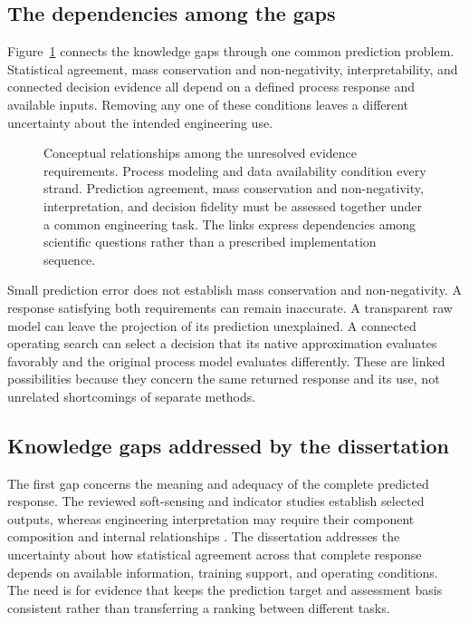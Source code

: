 \subsection{The dependencies among the gaps}

Figure~\ref{fig:rrl_intersecting_gaps} connects the knowledge gaps through one common prediction problem. Statistical agreement, mass conservation and non-negativity, interpretability, and connected decision evidence all depend on a defined process response and available inputs. Removing any one of these conditions leaves a different uncertainty about the intended engineering use.

\begin{figure}[htbp]
\centering
\begingroup\linespread{1}\selectfont

\endgroup
\caption{Conceptual relationships among the unresolved evidence requirements. Process modeling and data availability condition every strand. Prediction agreement, mass conservation and non-negativity, interpretation, and decision fidelity must be assessed together under a common engineering task. The links express dependencies among scientific questions rather than a prescribed implementation sequence.}
\label{fig:rrl_intersecting_gaps}
\end{figure}

Small prediction error does not establish mass conservation and non-negativity. A response satisfying both requirements can remain inaccurate. A transparent raw model can leave the projection of its prediction unexplained. A connected operating search can select a decision that its native approximation evaluates favorably and the original process model evaluates differently. These are linked possibilities because they concern the same returned response and its use, not unrelated shortcomings of separate methods.

\subsection{Knowledge gaps addressed by the dissertation}

The first gap concerns the meaning and adequacy of the complete predicted response. The reviewed soft-sensing and indicator studies establish selected outputs, whereas engineering interpretation may require their component composition and internal relationships \citep{Ching2022,Ekinci2023,Wang2025}. The dissertation addresses the uncertainty about how statistical agreement across that complete response depends on available information, training support, and operating conditions. The need is for evidence that keeps the prediction target and assessment basis consistent rather than transferring a ranking between different tasks.

